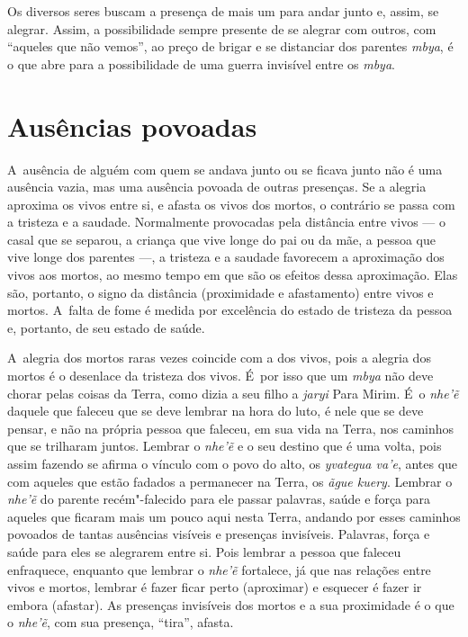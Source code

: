Os diversos seres buscam a presença de mais um para andar junto e,
assim, se alegrar. Assim, a possibilidade sempre presente de se alegrar
com outros, com ``aqueles que não vemos'', ao preço de brigar e se
distanciar dos parentes \emph{mbya}, é o que abre para a possibilidade de uma
guerra invisível entre os \emph{mbya}. 

\section{Ausências povoadas}

A~ausência de alguém com quem se andava junto ou se ficava junto não é
uma ausência vazia, mas uma ausência povoada de outras presenças. Se a
alegria aproxima os vivos entre si, e afasta os vivos dos mortos, o
contrário se passa com a tristeza e a saudade. Normalmente provocadas
pela distância entre vivos --- o casal que se separou, a criança que vive
longe do pai ou da mãe, a pessoa que vive longe dos parentes ---, a
tristeza e a saudade favorecem a aproximação dos vivos aos mortos, ao
mesmo tempo em que são os efeitos dessa aproximação. Elas são,
portanto, o signo da distância (proximidade e afastamento) entre vivos
e mortos. A~falta de fome é medida por excelência do estado de tristeza
da pessoa e, portanto, de seu estado de saúde. 

A~alegria dos mortos raras vezes coincide com a dos vivos, pois a
alegria dos mortos é o desenlace da tristeza dos vivos. É~por isso que
um \emph{mbya} não deve chorar pelas coisas da Terra, como dizia a seu filho a
\emph{jaryi} Para Mirim. É~o \emph{nhe’ẽ} daquele que faleceu que se deve
lembrar na hora do luto, é nele que se deve pensar, e não na própria
pessoa que faleceu, em sua vida na Terra, nos caminhos que se trilharam
juntos. Lembrar o \emph{nhe’ẽ} e o seu destino que é uma volta, pois
assim fazendo se afirma o vínculo com o povo do alto, os \emph{yvategua va’e},
antes que com aqueles que estão fadados a permanecer na Terra, os \emph{ãgue
kuery}. Lembrar o \emph{nhe’ẽ} do parente recém"-falecido para ele passar
palavras, saúde e força para aqueles que ficaram mais um pouco aqui
nesta Terra, andando por esses caminhos povoados de tantas ausências
visíveis e presenças invisíveis. Palavras, força e saúde para eles se
alegrarem entre si. Pois lembrar a pessoa que faleceu enfraquece,
enquanto que lembrar o \emph{nhe’ẽ} fortalece, já que nas relações entre
vivos e mortos, lembrar é fazer ficar perto (aproximar) e esquecer é
fazer ir embora (afastar). As presenças invisíveis dos mortos e a sua
proximidade é o que o \emph{nhe’ẽ}, com sua presença, ``tira'', afasta.

